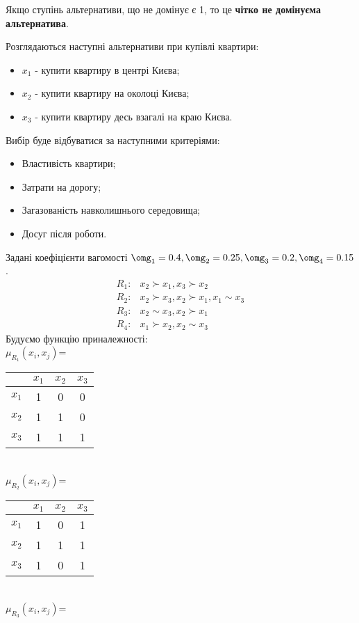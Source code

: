 Якщо ступінь альтернативи, що не домінує є 1, то це \textbf{чітко не домінуєма альтернатива}.
\begin{exs}
Розглядаються наступні альтернативи при купівлі квартири:
\begin{itemize}
\item $x_1$ - купити квартиру в центрі Києва;
\item $x_2$ - купити квартиру на околоці Києва;
\item $x_3$ - купити квартиру десь взагалі на краю Києва.
\end{itemize}
Вибір буде відбуватися за наступними критеріями:
\begin{itemize}
\item Властивість квартири;
\item Затрати на дорогу;
\item Загазованість навколишнього середовища;
\item Досуг після роботи.
\end{itemize}
Задані коефіцієнти вагомості $\omg_1=0.4,\omg_2=0.25,\omg_3 = 0.2,\omg_4 = 0.15$.\\
\begin{eqnarray*}
R_1:& x_2\succ x_1, x_3 \succ x_2\\
R_2:& x_2 \succ x_3, x_2\succ x_1, x_1 \sim x_3\\
R_3:& x_2\sim x_3, x_2 \succ x_1\\
R_4:& x_1 \succ x_2, x_2 \sim x_3
\end{eqnarray*}
Будуємо функцію приналежності:\\
$\mu_{R_1}(x_i,x_j)$=\begin{tabular}{c|c|c|c}
 & $x_1$ & $x_2$ & $x_3$ \\ 
\hline 
$x_1$ & 1 & 0 & 0 \\ 
\hline 
$x_2$ & 1 & 1 & 0 \\ 
\hline 
$x_3$ & 1 & 1 & 1 \\ 
\end{tabular} \\
$\mu_{R_2}(x_i,x_j)$=\begin{tabular}{c|c|c|c}
 & $x_1$ & $x_2$ & $x_3$ \\ 
\hline 
$x_1$ & 1 & 0 & 1 \\ 
\hline
$x_2$ & 1 & 1 & 1 \\ 
\hline 
$x_3$ & 1 & 0 & 1 \\ 
\end{tabular} \\
$\mu_{R_3}(x_i,x_j)$=\begin{tabular}{c|c|c|c}

\end{tabular}
\end{exs}
